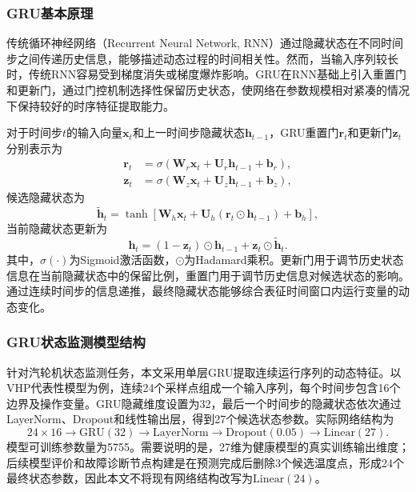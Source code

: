 \subsubsection{GRU基本原理}

传统循环神经网络（Recurrent Neural Network, RNN）通过隐藏状态在不同时间步之间传递历史信息，能够描述动态过程的时间相关性。然而，当输入序列较长时，传统RNN容易受到梯度消失或梯度爆炸影响。GRU在RNN基础上引入重置门和更新门，通过门控机制选择性保留历史状态，使网络在参数规模相对紧凑的情况下保持较好的时序特征提取能力\cite{Cho2014GRU}。

对于时间步$t$的输入向量$\mathbf{x}_t$和上一时间步隐藏状态$\mathbf{h}_{t-1}$，GRU重置门$\mathbf{r}_t$和更新门$\mathbf{z}_t$分别表示为
\begin{align}
    \mathbf{r}_t &=
    \sigma\left(
    \mathbf{W}_r\mathbf{x}_t+
    \mathbf{U}_r\mathbf{h}_{t-1}+
    \mathbf{b}_r
    \right),\\
    \mathbf{z}_t &=
    \sigma\left(
    \mathbf{W}_z\mathbf{x}_t+
    \mathbf{U}_z\mathbf{h}_{t-1}+
    \mathbf{b}_z
    \right),
\end{align}
候选隐藏状态为
\begin{equation}
    \tilde{\mathbf{h}}_t=
    \tanh\left[
    \mathbf{W}_h\mathbf{x}_t+
    \mathbf{U}_h
    \left(
    \mathbf{r}_t\odot\mathbf{h}_{t-1}
    \right)+
    \mathbf{b}_h
    \right],
\end{equation}
当前隐藏状态更新为
\begin{equation}
    \mathbf{h}_t=
    (1-\mathbf{z}_t)\odot\mathbf{h}_{t-1}
    +
    \mathbf{z}_t\odot\tilde{\mathbf{h}}_t.
    \label{eq:gru_hidden}
\end{equation}
其中，$\sigma(\cdot)$为Sigmoid激活函数，$\odot$为Hadamard乘积。更新门用于调节历史状态信息在当前隐藏状态中的保留比例，重置门用于调节历史信息对候选状态的影响。通过连续时间步的信息递推，最终隐藏状态能够综合表征时间窗口内运行变量的动态变化。

\subsubsection{GRU状态监测模型结构}

针对汽轮机状态监测任务，本文采用单层GRU提取连续运行序列的动态特征。以VHP代表性模型为例，连续24个采样点组成一个输入序列，每个时间步包含16个边界及操作变量。GRU隐藏维度设置为32，最后一个时间步的隐藏状态依次通过LayerNorm、Dropout和线性输出层，得到27个候选状态参数。实际网络结构为
\begin{equation}
24\times16
\rightarrow
\mathrm{GRU}(32)
\rightarrow
\mathrm{LayerNorm}
\rightarrow
\mathrm{Dropout}(0.05)
\rightarrow
\mathrm{Linear}(27).
\label{eq:gru_arch}
\end{equation}
模型可训练参数量为5755。需要说明的是，27维为健康模型的真实训练输出维度；后续模型评价和故障诊断节点构建是在预测完成后删除3个候选温度点，形成24个最终状态参数，因此本文不将现有网络结构改写为$\mathrm{Linear}(24)$。

